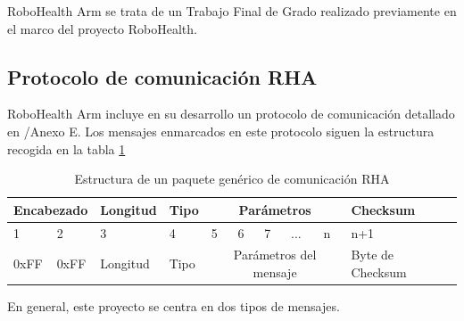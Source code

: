 RoboHealth Arm se trata de un Trabajo Final de Grado\cite{Heredia1:2018} realizado previamente en el marco del proyecto RoboHealth.

\subsection{Protocolo de comunicación RHA}

RoboHealth Arm incluye en su desarrollo un protocolo de comunicación detallado en \cite{Heredia1:2018}/Anexo E. Los mensajes enmarcados en este protocolo siguen la estructura recogida en la tabla \ref{tab:RHAcom}

\begin{table}[H]
\begin{center}
\begin{tabular}{|m{15mm}|m{15mm}|m{15mm}|m{15mm}|m{5mm}|m{5mm}|m{5mm}|m{5mm}|m{5mm}|m{20mm}|}
\hline
\multicolumn{2}{|c|}{\textbf{Encabezado}} & \textbf{Longitud} & \textbf{Tipo} & \multicolumn{5}{|c|}{\textbf{Parámetros}} & \textbf{Checksum}\\
\hline
\hline
1 & 2 & 3 & 4 & 5 & 6 & 7 & ... & n & n+1\\
\hline
0xFF & 0xFF & Longitud & Tipo & \multicolumn{5}{|c|}{Parámetros del mensaje} & Byte de Checksum\\
\hline
\end{tabular}
\end{center}
\caption{Estructura de un paquete genérico de comunicación RHA}
\label{tab:RHAcom}
\end{table}

En general, este proyecto se centra en dos tipos de mensajes.

